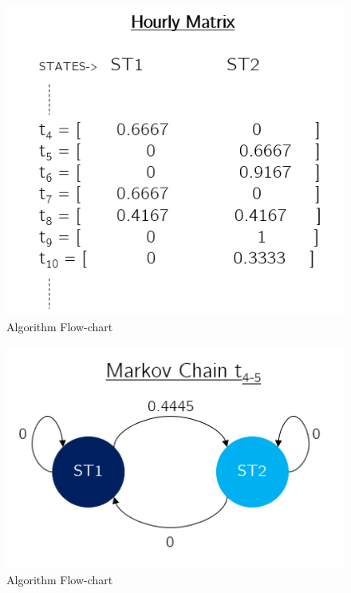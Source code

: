 \documentclass{article}
\begin{document}
\begin{figure}[h!]
\centering
\includegraphics[scale=.34]{hourlymat.png}
\caption{Algorithm Flow-chart}
\label{fig:flow-chart}
\end{figure}

\begin{figure}[h!]
\centering
\includegraphics[scale=.35]{markovchain.png}
\caption{Algorithm Flow-chart}
\label{fig:flow-chart}
\end{figure}
\end{document}
